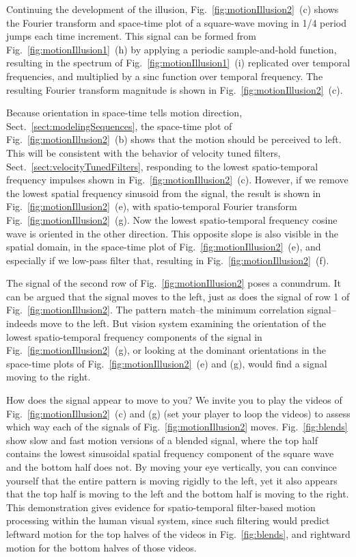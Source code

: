 Continuing the development of the illusion, Fig.~\ref{fig:motionIllusion2}~(c) shows the Fourier transform and space-time plot of a square-wave moving in 1/4 period jumps each time increment.  This signal can be formed from Fig.~\ref{fig:motionIllusion1}~(h) by applying a periodic sample-and-hold function, resulting in the spectrum of  Fig.~\ref{fig:motionIllusion1}~(i) replicated over temporal frequencies, and multiplied by a sinc function over temporal frequency.  The resulting Fourier transform magnitude is shown in Fig.~\ref{fig:motionIllusion2}~(c).

Because orientation in space-time tells motion direction, Sect.~\ref{sect:modelingSequences}, the space-time plot of Fig.~\ref{fig:motionIllusion2}~(b) shows that the motion should be perceived to left.  This will be consistent with the behavior of velocity tuned filters, Sect.~\ref{sect:velocityTunedFilters}, responding to the lowest spatio-temporal frequency impulses shown in
Fig.~\ref{fig:motionIllusion2}~(c). However, if we remove the lowest spatial frequency sinusoid from the signal, the result is shown in
Fig.~\ref{fig:motionIllusion2}~(e), with spatio-temporal Fourier transform Fig.~\ref{fig:motionIllusion2}~(g).  Now the lowest spatio-temporal frequency cosine wave is oriented in the other direction.  This opposite slope is also visible in the spatial domain, in the space-time plot of Fig.~\ref{fig:motionIllusion2}~(e), and especially if we low-pass filter that, resulting in Fig.~\ref{fig:motionIllusion2}~(f).

The signal of the second row of Fig.~\ref{fig:motionIllusion2} poses a conundrum.  It can be argued that the signal moves to the left, just as does the signal of row 1 of Fig.~\ref{fig:motionIllusion2}.  The pattern match--the minimum correlation signal--indeeds move to the left.  But vision system examining the orientation of the lowest spatio-temporal frequency components of the signal in Fig.~\ref{fig:motionIllusion2}~(g), or looking at the dominant orientations in the space-time plots of
Fig.~\ref{fig:motionIllusion2}~(e) and (g), would find a signal moving to the right.

How does the signal appear to move to you?  We invite you to play the videos of Fig.~\ref{fig:motionIllusion2}~(c) and (g) (set your player to loop the videos) to assess which way each of the signals of  Fig.~\ref{fig:motionIllusion2} moves.   Fig.~\ref{fig:blends} show slow and fast motion versions of a blended signal, where the top half contains the lowest sinusoidal spatial frequency component of the square wave and the bottom half does not.  By moving your eye vertically, you can convince yourself that the entire pattern is moving rigidly to the left, yet it also appears that the top half is moving to the left and the bottom half is moving to the right.  This demonstration gives evidence for spatio-temporal filter-based motion processing within the human visual system, since such filtering would predict leftward motion for the top halves of the videos in Fig.~\ref{fig:blends}, and rightward motion for the bottom halves of those videos.

